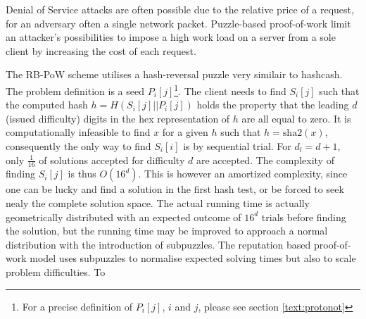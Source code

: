 %
%

Denial of Service attacks are often possible due to the relative price of a request, for an adversary often a single network packet\cite{gunter}. Puzzle-based proof-of-work limit an attacker's possibilities to impose a high work load on a server from a sole client by increasing the cost of each request. 

The RB-PoW scheme utilises a hash-reversal puzzle very similair to hashcash. The problem definition is a seed $P_i[j]$\footnote{For a precise definition of $P_i[j]$, $i$ and $j$, please see section \ref{text:protonot}}. The client needs to find $S_i[j]$ such that the computed hash $ h = H(S_i[j]||P_i[j])$ holds the property that the leading $d$ (issued difficulty) digits in the hex representation of $h$ are all equal to zero. It is computationally infeasible to find $x$  for a given $h$ such that $ h = \mbox{sha2}(x)$\cite{sha2}, consequently the only way to find $S_i[i]$ is by sequential trial. For $d_l = d + 1 $, only $\frac{1}{16}$ of solutions accepted for difficulty $d$ are accepted. The complexity of finding $S_i[j]$ is thus $O(16^d)$. This is however an amortized complexity, since one can be lucky and find a solution in the first hash test, or be forced to seek nealy the complete solution space. The actual running time is actually geometrically distributed with an expected outcome of $16^d$ trials before finding the solution, but the running time may be improved to approach a normal distribution with the introduction of subpuzzles\cite{subpuzzles}. The reputation based proof-of-work model uses subpuzzles to normalise expected solving times but also to scale problem difficulties. To 

